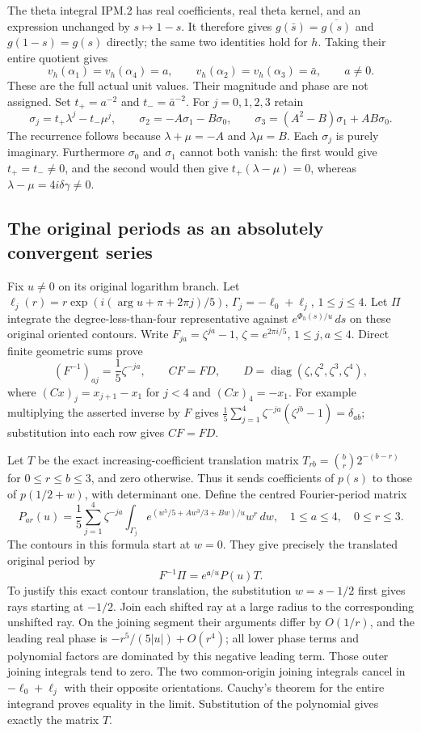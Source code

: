 \documentclass[11pt,a4paper]{article}
\begin{document}
The theta integral IPM.2 has real coefficients, real theta kernel,
and an expression unchanged by $s\mapsto1-s$. It therefore gives
$g(\bar s)=\overline{g(s)}$ and $g(1-s)=g(s)$ directly; the same
two identities hold for $h$. Taking their entire quotient gives
\[
 v_h(\alpha_1)=v_h(\alpha_4)=a,\qquad
 v_h(\alpha_2)=v_h(\alpha_3)=\bar a,\qquad a\ne0.
 \tag{PQO3}
\]
These are the full actual unit values. Their magnitude and phase
are not assigned. Set $t_+=a^{-2}$ and $t_-=\bar a^{-2}$.
For $j=0,1,2,3$ retain
\[
 \sigma_j=t_+\lambda^j-t_-\mu^j,\qquad
 \sigma_2=-A\sigma_1-B\sigma_0,\qquad
 \sigma_3=(A^2-B)\sigma_1+AB\sigma_0.
 \tag{PQO4}
\]
The recurrence follows because $\lambda+\mu=-A$ and
$\lambda\mu=B$. Each $\sigma_j$ is purely imaginary.
Furthermore $\sigma_0$ and $\sigma_1$ cannot both vanish:
the first would give $t_+=t_-\ne0$, and the second would then
give $t_+(\lambda-\mu)=0$, whereas
$\lambda-\mu=4i\delta\gamma\ne0$.

\subsection{The original periods as an absolutely convergent series}
Fix $u\ne0$ on its original logarithm branch. Let
$\ell_j(r)=r\exp(i(\arg u+\pi+2\pi j)/5)$,
$\Gamma_j=-\ell_0+\ell_j$, $1\leq j\leq4$.
Let $\Pi$ integrate the degree-less-than-four representative
against $e^{\Phi_h(s)/u}\,ds$ on these original oriented contours.
Write $F_{ja}=\zeta^{ja}-1$, $\zeta=e^{2\pi i/5}$,
$1\leq j,a\leq4$. Direct finite geometric sums prove
\[
 (F^{-1})_{aj}=\frac15\zeta^{-ja},\qquad
 CF=F D,\qquad D=\operatorname{diag}(\zeta,\zeta^2,\zeta^3,\zeta^4),
 \tag{PQO5}
\]
where $(Cx)_j=x_{j+1}-x_1$ for $j<4$ and $(Cx)_4=-x_1$.
For example multiplying the asserted inverse by $F$ gives
$\frac15\sum_{j=1}^4\zeta^{-ja}(\zeta^{jb}-1)=\delta_{ab}$;
substitution into each row gives $CF=FD$.

Let $T$ be the exact increasing-coefficient translation matrix
$T_{rb}=\binom br2^{-(b-r)}$ for $0\leq r\leq b\leq3$, and
zero otherwise. Thus it sends coefficients of $p(s)$ to those
of $p(1/2+w)$, with determinant one. Define the centred
Fourier-period matrix
\[
 P_{ar}(u)=\frac15\sum_{j=1}^4\zeta^{-ja}
 \int_{\Gamma_j}e^{(w^5/5+Aw^3/3+Bw)/u}w^r\,dw,
 \quad 1\leq a\leq4,\quad0\leq r\leq3.
 \tag{PQO6}
\]
The contours in this formula start at $w=0$. They give precisely
the translated original period by
\[
 F^{-1}\Pi=e^{\mathfrak a/u}P(u)T.
 \tag{PQO7}
\]
To justify this exact contour translation, the substitution
$w=s-1/2$ first gives rays starting at $-1/2$. Join each shifted
ray at a large radius to the corresponding unshifted ray. On the
joining segment their arguments differ by $O(1/r)$, and the
leading real phase is $-r^5/(5|u|)+O(r^4)$; all lower phase
terms and polynomial factors are dominated by this negative
leading term. Those outer joining integrals tend to zero.
The two common-origin joining integrals cancel in
$-\ell_0+\ell_j$ with their opposite orientations. Cauchy's
theorem for the entire integrand proves equality in the limit.
Substitution of the polynomial gives exactly the matrix $T$.
\end{document}
